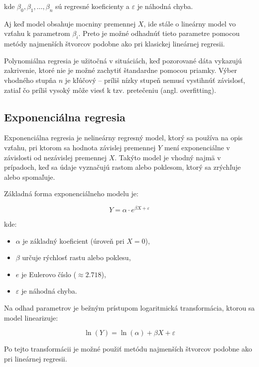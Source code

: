 kde $\beta_0, \beta_1, \dots, \beta_n$ sú regresné koeficienty a $\varepsilon$ je náhodná chyba.

Aj keď model obsahuje mocniny premennej $X$, ide stále o lineárny model vo vzťahu k parametrom $\beta_i$. Preto je možné odhadnúť tieto parametre pomocou metódy najmenších štvorcov podobne ako pri klasickej lineárnej regresii.

Polynomiálna regresia je užitočná v situáciách, keď pozorované dáta vykazujú zakrivenie, ktoré nie je možné zachytiť štandardne pomocou priamky. Výber vhodného stupňa $n$ je kľúčový – príliš nízky stupeň nemusí vystihnúť závislosť, zatiaľ čo príliš vysoký môže viesť k tzv. pretečeniu (angl. overfitting).

\subsection{Exponenciálna regresia}
\label{subsec:exponential_regression}

Exponenciálna regresia je nelineárny regresný model, ktorý sa používa na opis vzťahu, pri ktorom sa hodnota závislej premennej $Y$ mení exponenciálne v závislosti od nezávislej premennej $X$. Takýto model je vhodný najmä v prípadoch, keď sa údaje vyznačujú rastom alebo poklesom, ktorý sa zrýchľuje alebo spomaľuje.

Základná forma exponenciálneho modelu je:

\begin{equation}
Y = \alpha \cdot e^{\beta X+\varepsilon}
\end{equation}

kde:
\begin{itemize}
  \item $\alpha$ je základný koeficient (úroveň pri $X=0$),
  \item $\beta$ určuje rýchlosť rastu alebo poklesu,
  \item $e$ je Eulerovo číslo ($\approx 2.718$),
  \item $\varepsilon$ je náhodná chyba.
\end{itemize}

Na odhad parametrov je bežným prístupom logaritmická transformácia, ktorou sa model linearizuje:

\begin{equation}
\ln(Y) = \ln(\alpha) + \beta X + \varepsilon
\end{equation}

Po tejto transformácii je možné použiť metódu najmenších štvorcov podobne ako pri lineárnej regresii.

